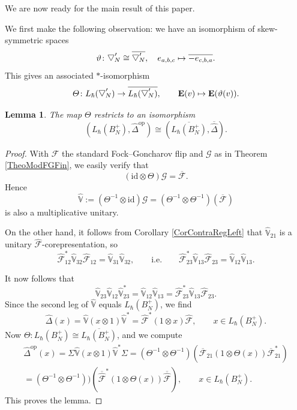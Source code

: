 \documentclass[11pt, reqno]{amsart}
\newtheorem{lemma}[theorem]{Lemma}
\theoremstyle{definition}
\numberwithin{equation}{section}
\newcommand{\eb}{\mathbf{E}}
\newcommand{\Fct}{\mathcal{F}}
\newcommand{\tFct}{\mathcal{G}}
\newcommand{\Bor}{B}
\newcommand{\id}{\mathrm{id}}
\newcommand{\wbtd}[1]{\raisebox{\depth}{$\bigtriangledown'$\!\!}_{#1}}
\newcommand{\Vbb}{\mathbb{V}}
\newcommand{\opp}{\mathrm{op}}
\begin{document}
We are now ready for the main result of this paper. 

We first make the following observation: we have an isomorphism of skew-symmetric spaces
\begin{equation}\label{EqVarTheta}
\vartheta\colon  \wbtd{N}\cong \overline{\wbtd{N}},\quad e_{a,b,c} \mapsto \overline{-e_{c,b,a}}.
\end{equation}
This gives an associated $*$-isomorphism 
\begin{equation}\label{EqFlipSo}
\varTheta\colon  L_{\hbar}(\wbtd{N}) \rightarrow \overline{L_{\hbar}(\wbtd{N})},\qquad \eb(v) \mapsto \eb(\vartheta(v)). 
\end{equation}

\begin{lemma}\label{LemRightMUreg} 
The map $\varTheta$ restricts to an isomorphism 
\begin{equation}\label{EqVarThetOr}
(L_{\hbar}(\Bor_N^+),\hat{\Delta}^{\opp}) \cong (\overline{L_{\hbar}(\Bor_N^+)},\overline{\hat{\Delta}}).
\end{equation}
\end{lemma}
\begin{proof}
With $\Fct$ the standard Fock--Goncharov flip and $\tFct$ as in Theorem \ref{TheoModFGFin}, we easily verify that
\[
(\id\otimes \varTheta)\tFct = \overline{\Fct}.
\] 
Hence 
\[
\hat{\Vbb} := (\varTheta^{-1}\otimes \id)\tFct= (\varTheta^{-1}\otimes \varTheta^{-1})(\overline{\Fct})
\]
is also a multiplicative unitary. 

On the other hand, it follows from Corollary \ref{CorContraRegLeft} that $\hat{\Vbb}_{21}$ is a unitary $\hat{\Fct}$-corepresentation, so 
\[
\hat{\Fct}_{12}^* \hat{\Vbb}_{32} \hat{\Fct}_{12} = \hat{\Vbb}_{31} \hat{\Vbb}_{32},\qquad \textrm{i.e.}\qquad  \hat{\Fct}_{23}^* \hat{\Vbb}_{13} \hat{\Fct}_{23} = \hat{\Vbb}_{12} \hat{\Vbb}_{13}.
\]

It now follows that 
\[
\hat{\Vbb}_{23}\hat{\Vbb}_{12} \hat{\Vbb}_{23}^* = \hat{\Vbb}_{12}\hat{\Vbb}_{13} = \hat{\Fct}_{23}^*\hat{\Vbb}_{13}\hat{\Fct}_{23}.
\]
Since the second leg of $\hat{\Vbb}$ equals $L_{\hbar}(\Bor_N^+)$, we find 
\[
\hat{\Delta}(x) = \hat{\Vbb}(x\otimes 1)\hat{\Vbb}^* = \hat{\Fct}^*(1\otimes x)\hat{\Fct},\qquad x\in L_{\hbar}(\Bor_N^+). 
\]
Now $\varTheta\colon  L_{\hbar}(\Bor_N^+) \cong \overline{L_{\hbar}(\Bor_N^+)}$, and we compute 
\begin{multline*}
\hat{\Delta}^{\opp}(x) =\Sigma \hat{\Vbb}(x\otimes 1)\hat{\Vbb}^*\Sigma = (\varTheta^{-1}\otimes \varTheta^{-1})(\overline{\Fct}_{21}(1\otimes \varTheta(x))\overline{\Fct}_{21}^*) \\
= (\varTheta^{-1}\otimes \varTheta^{-1}))(\overline{\hat{\Fct}}^*(1\otimes \varTheta(x))\overline{\hat{\Fct}})
,\qquad x\in L_{\hbar}(\Bor_N^+).
\end{multline*}
This proves the lemma.
\end{proof}
\end{document}
